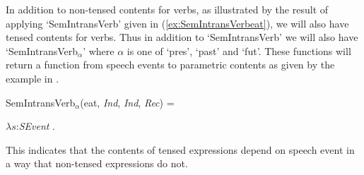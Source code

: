 In addition to non-tensed contents for verbs, as illustrated by the
result of applying `SemIntransVerb' given in
(\ref{ex:SemIntransVerbeat}), we will also have tensed contents for
verbs.  Thus in addition to `SemIntransVerb' we will also have
`SemIntransVerb$_\alpha$' where $\alpha$ is one of `pres', `past' and
`fut'.  These functions will return a function from speech events to
parametric contents as given by the example in \nexteg{}.
\begin{ex} 
SemIntransVerb$_\alpha$(eat,
\textit{Ind}, \textit{Ind}, \textit{Rec}) = 

$\lambda s$:\textit{SEvent} . 
\end{ex} 
This indicates that the contents of tensed expressions depend on
speech event in a way that non-tensed expressions do not.

